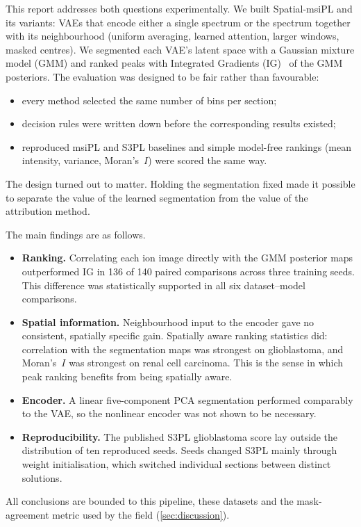 This report addresses both questions experimentally. We built Spatial-msiPL
and its variants: VAEs
that encode either a single spectrum or the spectrum together with its
neighbourhood (uniform averaging, learned attention, larger windows, masked
centres). We segmented each VAE's latent space with a Gaussian mixture model
(GMM) and ranked peaks with Integrated Gradients (IG)~\citep{sundararajan2017axiomatic}
of the GMM posteriors. The evaluation was designed to be fair rather than
favourable:
\begin{itemize}
  \item every method selected the same number of bins per section;
  \item decision rules were written down before the corresponding results existed;
  \item reproduced msiPL and S3PL baselines and simple model-free rankings
        (mean intensity, variance, Moran's~$I$) were scored the same way.
\end{itemize}
The design turned out to matter. Holding the segmentation fixed made it
possible to separate the value of the learned segmentation from the value of
the attribution method.

The main findings are as follows.
\begin{itemize}
  \item \textbf{Ranking.} Correlating each ion image directly with the GMM
        posterior maps outperformed IG in 136 of 140 paired comparisons across
        three training seeds. This difference was statistically supported in all
        six dataset--model comparisons.
  \item \textbf{Spatial information.} Neighbourhood input to the encoder gave
        no consistent, spatially specific gain. Spatially aware ranking
        statistics did: correlation with the segmentation maps was strongest on
        glioblastoma, and Moran's~$I$ was strongest on renal cell carcinoma.
        This is the sense in which peak ranking benefits from being spatially
        aware.
  \item \textbf{Encoder.} A linear five-component PCA segmentation performed
        comparably to the VAE, so the nonlinear encoder was not shown to be
        necessary.
  \item \textbf{Reproducibility.} The published S3PL glioblastoma score lay
        outside the distribution of ten reproduced seeds. Seeds changed S3PL
        mainly through weight initialisation, which switched individual sections
        between distinct solutions.
\end{itemize}
All conclusions are bounded to this pipeline, these datasets and the
mask-agreement metric used by the field (\cref{sec:discussion}).

